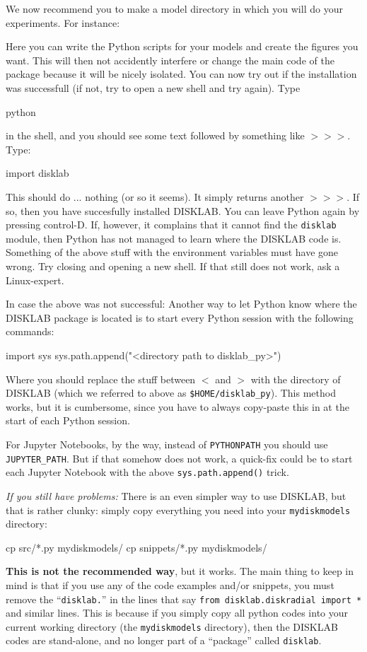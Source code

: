 \documentclass{book}
\newcommand{\code}[1]{{\small\tt #1}}
\begin{document}
We now recommend you to make a model directory in which you will do your
experiments. For instance:
Here you can write the Python scripts for your models and create the figures you
want. This will then not accidently interfere or change the main code of the
package because it will be nicely isolated. You can now try out if the
installation was successfull (if not, try to open a new shell and try again).
Type
\begin{codebox}
python
\end{codebox}
in the shell, and you should see some text followed by something like \code{$>>>$}.
Type:
\begin{codebox}
import disklab
\end{codebox}
This should do ... nothing (or so it seems). It simply returns another
\code{$>>>$}.  If so, then you have succesfully installed {\sf DISKLAB}. You can
leave Python again by pressing control-D. If, however, it complains that it
cannot find the \code{disklab} module, then Python has not managed to learn
where the {\sf DISKLAB} code is. Something of the above stuff with the
environment variables must have gone wrong. Try closing and opening a new shell.
If that still does not work, ask a Linux-expert.

In case the above was not successful: Another way to let Python know where the
{\sf DISKLAB} package is located is to start every Python session with the
following commands:
\begin{codebox}
import sys
sys.path.append("<directory path to disklab_py>")
\end{codebox}
Where you should replace the stuff between $<$ and $>$ with the directory of
{\sf DISKLAB} (which we referred to above as \code{\$HOME/disklab\_py}). This
method works, but it is cumbersome, since you have to always copy-paste this in
at the start of each Python session.

For Jupyter Notebooks, by the way, instead of \code{PYTHONPATH} you should use
\code{JUPYTER\_PATH}. But if that somehow does not work, a quick-fix could
be to start each Jupyter Notebook with the above \code{sys.path.append()}
trick.

{\em If you still have problems:} There is an even simpler way to use
{\sf DISKLAB}, but that is rather clunky: simply copy everything you need
into your \code{mydiskmodels} directory:
\begin{codebox}
cp src/*.py mydiskmodels/
cp snippets/*.py mydiskmodels/
\end{codebox}
{\bf This is not the recommended way}, but it works. The main thing to keep in
mind is that if you use any of the code examples and/or snippets, you must
remove the ``\code{disklab.}'' in the lines that say \code{from disklab.diskradial
  import *} and similar lines. This is because if you simply copy all python codes
into your current working directory (the \code{mydiskmodels} directory),
then the {\sf DISKLAB} codes are stand-alone, and no longer part of a ``package''
called \code{disklab}.
\end{document}
